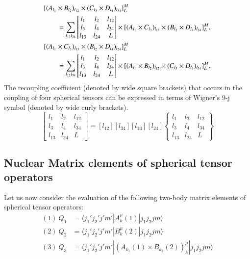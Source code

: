 \begin{align}
& [(A_{l_1} \times B_{l_2})_{l_{12}} \times (C_{l_3} \times D_{l_4})_{l_{34}}]^M_L \notag \\
& \qquad = \sum_{l_{13} l_{24}}
	\begin{bmatrix}l_1 & l_2 & l_{12}\\l_3 & l_4 & l_{34}\\l_{13} & l_{24} & L\end{bmatrix}
	\times [(A_{l_1} \times C_{l_3})_{l_{13}} \times (B_{l_2} \times D_{l_4})_{l_{24}}]^M_L. \label{chap3-eq10}\\
& [(A_{l_1} \times C_{l_3})_{l_{13}} \times (B_{l_2} \times D_{l_4})_{l_{24}}]^M_L  \notag \\
& \qquad = \sum_{l_{12} l_{34}}
	\begin{bmatrix}l_1 & l_2 & l_{12}\\l_3 & l_4 & l_{34}\\l_{13} & l_{24} & L\end{bmatrix} 
	\times [(A_{l_1} \times B_{l_2})_{l_{12}} \times (C_{l_3} \times D_{l_4})_{l_{34}}]^M_L. \label{chap3-eq11}
\end{align}
The recoupling coefficient (denoted by wide square brackets) that occurs in the coupling of four spherical tensors can be expressed in terms of Wigner's 9-j symbol (denoted by wide curly brackets).
\begin{equation}
	\begin{bmatrix}l_1 & l_2 & l_{12}\\l_3 & l_4 & l_{34}\\l_{13} & l_{24} & L\end{bmatrix} 
	= [l_{12}] [l_{34}] [l_{13}] [l_{24}] 
	\left\{\begin{matrix}l_1 & l_2 & l_{12}\\l_3 & l_4 & l_{34}\\l_{13} & l_{24} & L\end{matrix} \right\} \label{chap3-eq12}
\end{equation}

\subsection{Nuclear Matrix clements of spherical tensor operators}\label{chap3-sec2.1}

Let us now consider the evaluation of the following two-body matrix elements of spherical tensor operators:
\begin{align}
(1) ~ Q_1 & = \langle j_1' j_2' j' m' |A_k^\mu (1)| j_1 j_2 j m \rangle \label{chap3-eq13}\\
(2) ~ Q_2 & = \langle j_1' j_2' j' m' |B_k^\mu (2)| j_1 j_2 j m \rangle \label{chap3-eq14}\\
(3) ~ Q_3 & = \langle j_1' j_2' j' m' |(A_{k_1} (1) \times B_{k_2} (2))_k^\mu  | j_1 j_2 j m \rangle \label{chap3-eq15}
\end{align}

